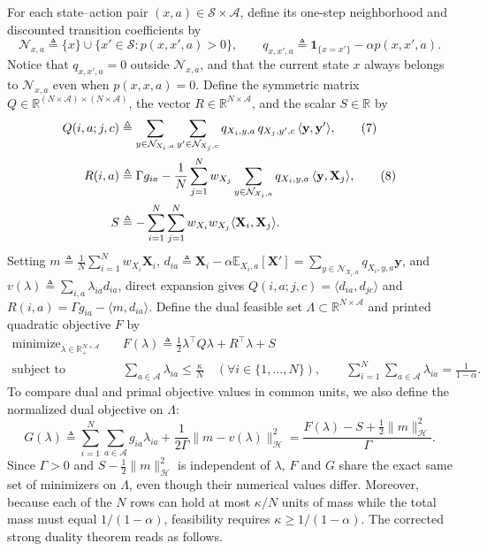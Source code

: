 \documentclass[11pt,letterpaper]{article}
\newcommand{\E}{\mathbb{E}}
\newcommand{\R}{\mathbb{R}}
\newcommand{\ip}[2]{\langle #1, #2\rangle}
\newcommand{\norm}[1]{\lVert #1\rVert}
\newcommand{\defeq}{\triangleq}
\theoremstyle{definition}
\begin{document}
For each state--action pair $(x,a)\in\mathcal{S}\times\mathcal{A}$, define its one-step neighborhood and discounted transition coefficients by
\[
 \mathcal{N}_{x,a} \defeq \{x\} \cup \{x'\in\mathcal{S} : p(x,x',a) > 0\}, \qquad
 q_{x,x',a} \defeq \mathbf{1}_{\{x=x'\}} - \alpha p(x,x',a).
\]
Notice that $q_{x,x',a} = 0$ outside $\mathcal{N}_{x,a}$, and that the current state $x$ always belongs to $\mathcal{N}_{x,a}$ even when $p(x,x,a) = 0$. Define the symmetric matrix $Q \in \R^{(N\times\mathcal{A})\times(N\times\mathcal{A})}$, the vector $R \in \R^{N\times\mathcal{A}}$, and the scalar $S \in \R$ by
\begin{align}
 Q(i,a;j,c) &\defeq \sum_{y\in\mathcal{N}_{X_i,a}} \sum_{y'\in\mathcal{N}_{X_j,c}} q_{X_i,y,a}\, q_{X_j,y',c}\, \ip{\mathbf{y}}{\mathbf{y}'},
 \tag{7}\label{eq:7}\\
 R(i,a) &\defeq \Gamma g_{ia} - \frac{1}{N}\sum_{j=1}^N w_{X_j} \sum_{y\in\mathcal{N}_{X_i,a}} q_{X_i,y,a}\, \ip{\mathbf{y}}{\mathbf{X}_j},
 \tag{8}\label{eq:8}\\
 S &\defeq -\sum_{i=1}^N \sum_{j=1}^N w_{X_i} w_{X_j} \ip{\mathbf{X}_i}{\mathbf{X}_j}. \notag
\end{align}
Setting $m \defeq \frac{1}{N}\sum_{i=1}^N w_{X_i}\mathbf{X}_i$, $d_{ia} \defeq \mathbf{X}_i - \alpha\E_{X_i,a}[\mathbf{X}'] = \sum_{y\in\mathcal{N}_{X_i,a}} q_{X_i,y,a}\mathbf{y}$, and $v(\lambda) \defeq \sum_{i,a} \lambda_{ia} d_{ia}$, direct expansion gives $Q(i,a;j,c) = \ip{d_{ia}}{d_{jc}}$ and $R(i,a) = \Gamma g_{ia} - \ip{m}{d_{ia}}$. Define the dual feasible set $\Lambda \subset \R^{N\times\mathcal{A}}$ and printed quadratic objective $F$ by
\begin{equation}
\begin{aligned}
 \text{minimize}_{\lambda\in\R_+^{N\times\mathcal{A}}}\quad & F(\lambda) \defeq \frac{1}{2}\lambda^\top Q\lambda + R^\top \lambda + S \\
 \text{subject to}\quad & \sum_{a\in\mathcal{A}} \lambda_{ia} \le \frac{\kappa}{N} \quad (\forall i\in\{1,\ldots,N\}), \qquad
 \sum_{i=1}^N \sum_{a\in\mathcal{A}} \lambda_{ia} = \frac{1}{1-\alpha}.
\end{aligned}
\tag{9}\label{eq:9}
\end{equation}
To compare dual and primal objective values in common units, we also define the normalized dual objective on $\Lambda$:
\[
 G(\lambda) \defeq \sum_{i=1}^N\sum_{a\in\mathcal{A}} g_{ia}\lambda_{ia} + \frac{1}{2\Gamma}\norm{m - v(\lambda)}_{\mathcal{H}}^2
 = \frac{F(\lambda) - S + \frac{1}{2}\norm{m}_{\mathcal{H}}^2}{\Gamma}.
\]
Since $\Gamma > 0$ and $S - \frac{1}{2}\norm{m}_{\mathcal{H}}^2$ is independent of $\lambda$, $F$ and $G$ share the exact same set of minimizers on $\Lambda$, even though their numerical values differ. Moreover, because each of the $N$ rows can hold at most $\kappa/N$ units of mass while the total mass must equal $1/(1-\alpha)$, feasibility requires $\kappa \ge 1/(1-\alpha)$. The corrected strong duality theorem reads as follows.
\end{document}
